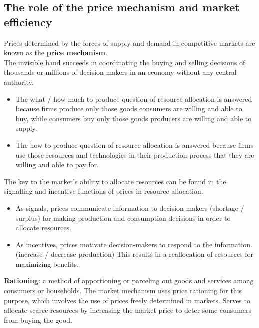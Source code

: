 \documentclass[a4paper,12pt]{article}
\newcommand{\needbold}[1]{\textcolor{red!70!black}{\textbf{#1}}}
\begin{document}
\subsection{The role of the price mechanism and market efficiency}
Prices determined by the forces of supply and demand in competitive markets are known as the \needbold{price mechanism}.\\
The invisible hand succeeds in coordinating the buying and selling decisions of thousands or millions of decision-makers in an economy without any central authority. 
\begin{itemize}
  \item The what / how much to produce question of resource allocation is answered because firms produce only those goods consumers are willing and able to buy, while consumers buy only those goods producers are willing and able to supply.
  \item The how to produce question of resource allocation is answered because firms use those resources and technologies in their production process that they are willing and able to pay for.
\end{itemize}
The key to the market's ability to allocate resources can be found in the signalling and incentive functions of prices in resource allocation. 
\begin{itemize}
  \item As signals, prices communicate information to decision-makers (shortage / surplus) for making production and consumption decisions in order to allocate resources.
  \item As incentives, prices motivate decision-makers to respond to the information. (increase / decrease production) This results in a reallocation of resources for maximizing benefits.
\end{itemize}
\needbold{Rationing}: a method of apportioning or parceling out goods and services among consumers or households. The market mechanism uses price rationing for this purpose, which involves the use of prices freely determined in markets. Serves to allocate scarce resources by increasing the market price to deter some consumers from buying the good.
\end{document}
